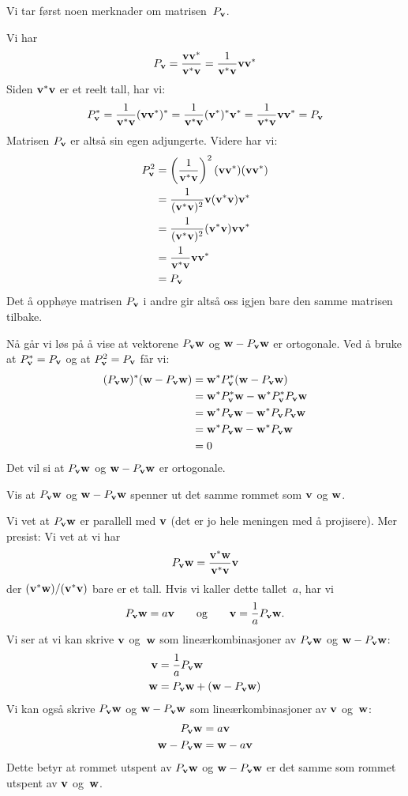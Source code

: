 \begin{losning}
Vi tar først noen merknader om matrisen~$P_\v$.

Vi har
\[
P_\v
= \frac{\v \v^*}{\v^* \v}
= \frac{1}{\v^* \v} \v \v^*
\]
Siden $\v^* \v$ er et reelt tall, har vi:
\[
P_\v^*
= \frac{1}{\v^* \v} (\v \v^*)^*
= \frac{1}{\v^* \v} (\v^*)^* \v^*
= \frac{1}{\v^* \v} \v \v^*
= P_\v
\]
Matrisen $P_\v$ er altså sin egen adjungerte.  Videre har vi:
\begin{align*}
P_\v^2
&= \left(\frac{1}{\v^* \v}\right)^2 (\v \v^*) (\v \v^*) \\
&= \frac{1}{(\v^* \v)^2} \v (\v^* \v) \v^* \\
&= \frac{1}{(\v^* \v)^2} (\v^* \v) \v \v^* \\
&= \frac{1}{\v^* \v} \v \v^* \\
&= P_\v
\end{align*}
Det å opphøye matrisen $P_\v$ i andre gir altså oss igjen bare den
samme matrisen tilbake.

Nå går vi løs på å vise at vektorene $P_\v \w$ og $\w - P_\v \w$ er
ortogonale.  Ved å bruke at $P_\v^* = P_\v$ og at $P_\v^2 = P_\v$ får
vi:
\begin{align*}
(P_\v \w)^* (\w - P_\v \w)
&= \w^* P_\v^* (\w - P_\v \w) \\
&= \w^* P_\v^* \w - \w^* P_\v^* P_\v \w \\
&= \w^* P_\v \w - \w^* P_\v P_\v \w \\
&= \w^* P_\v \w - \w^* P_\v \w \\
&= 0
\end{align*}
Det vil si at $P_\v \w$ og $\w - P_\v \w$ er ortogonale.
\end{losning}


\begin{oppgave}
Vis at $P_{\V v}\V w$ og $\V w-P_{\V v}\V w$ spenner ut det samme rommet som $\V v$ og $\V w$.
\end{oppgave}


\begin{losning}
Vi vet at $P_\v \w$ er parallell med $\v$ (det er jo hele meningen med
å projisere).  Mer presist: Vi vet at vi har
\[
P_\v \w = \frac{\v^* \w}{\v^* \v} \v
\]
der $(\v^* \w)/(\v^* \v)$ bare er et tall.  Hvis vi kaller dette
tallet~$a$, har vi
\[
P_\v \w = a \v
\qquad\text{og}\qquad
\v = \frac{1}{a} P_\v \w.
\]
Vi ser at vi kan skrive $\v$ og~$\w$ som lineærkombinasjoner av
$P_\v \w$ og $\w - P_\v \w$:
\begin{align*}
\v &= \frac{1}{a} P_\v \w \\
\w &= P_\v \w + (\w - P_\v \w)
\end{align*}
Vi kan også skrive $P_\v \w$ og $\w - P_\v \w$ som lineærkombinasjoner
av $\v$ og~$\w$:
\begin{align*}
P_\v \w &= a \v \\
\w - P_\v \w &= \w - a \v
\end{align*}
Dette betyr at rommet utspent av $P_\v \w$ og $\w - P_\v \w$ er det
samme som rommet utspent av $\v$ og~$\w$.
\end{losning}


